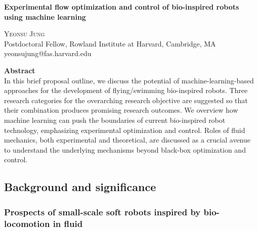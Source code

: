 \documentclass[12pt, a4paper]{article}
\begin{document}
%

%




{\LARGE\textbf{Experimental flow optimization and control of
bio-inspired robots using machine learning}}
\begin{center}
  \textsc{Yeonsu Jung}\\
  Postdoctoral Fellow, Rowland Institute at Harvard, Cambridge, MA\\
  yeonsujung@fas.harvard.edu
\end{center}

\textbf{Abstract}\\
In this brief proposal outline, we discuss the potential of
machine-learning-based approaches for the development of flying/swimming
bio-inspired robots. Three research categories for the overarching
research objective are suggested so that their combination produces
promising research outcomes. We overview how machine learning can push
the boundaries of current bio-inspired robot technology, emphasizing
experimental optimization and control. Roles of fluid mechanics, both
experimental and theoretical, are discussed as a crucial avenue to
understand the underlying mechanisms beyond black-box optimization and
control.

\vspace{3em}

\hypertarget{background-and-significance}{%
\subsection{Background and
significance}\label{background-and-significance}}

\hypertarget{prospects-of-small-scale-soft-robots-inspired-by-bio-locomotion-in-fluid}{%
\subsubsection{Prospects of small-scale soft robots inspired by
bio-locomotion in
fluid}\label{prospects-of-small-scale-soft-robots-inspired-by-bio-locomotion-in-fluid}}
\end{document}
